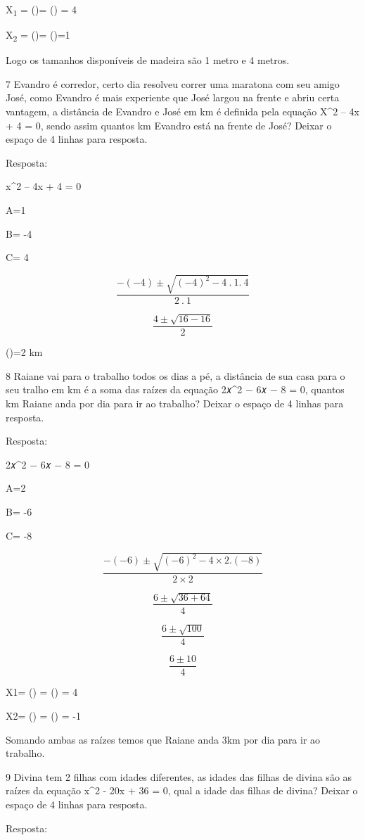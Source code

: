 X\textsubscript{1} = ()= () = 4

X\textsubscript{2} = ()= ()=1

Logo os tamanhos disponíveis de madeira são 1 metro e 4 metros.

\num{7} Evandro é corredor, certo dia resolveu correr uma maratona com seu
amigo José, como Evandro é mais experiente que José largou na frente e
abriu certa vantagem, a distância de Evandro e José em km é definida
pela equação X^2 -- 4x + 4 = 0, sendo assim quantos km Evandro está na
frente de José? Deixar o espaço de 4 linhas para resposta.

Resposta:

x^2 -- 4x + 4 = 0

A=1

B= -4

C= 4

\[\frac{- ( - 4) \pm \sqrt{{( - 4)}^{2} - 4\ .\ 1.\ 4}}{2\ .\ 1}\]

\[\frac{4 \pm \sqrt{16 - 16}}{2}\]

()=2 km

\num{8} Raiane vai para o trabalho todos os dias a pé, a distância de sua
casa para o seu tralho em km é a soma das raízes da equação 2𝑥^2 − 6𝑥 − 8
= 0, quantos km Raiane anda por dia para ir ao trabalho? Deixar o espaço
de 4 linhas para resposta.

Resposta:

2𝑥^2 − 6𝑥 − 8 = 0

A=2

B= -6

C= -8

\[\frac{- ( - 6) \pm \sqrt{{( - 6)}^{2} - 4\times 2.( - 8)}}{2\times 2}\]

\[\frac{6 \pm \sqrt{36 + 64}}{4}\]

\[\frac{6 \pm \sqrt{100}}{4}\]

\[\frac{6 \pm 10}{4}\]

X1= () = () = 4

X2= () = () = -1

Somando ambas as raízes temos que Raiane anda 3km por dia para ir ao
trabalho.

\num{9} Divina tem 2 filhas com idades diferentes, as idades das filhas de
divina são as raízes da equação x^2 - 20x + 36 = 0, qual a idade das
filhas de divina? Deixar o espaço de 4 linhas para resposta.

Resposta:

